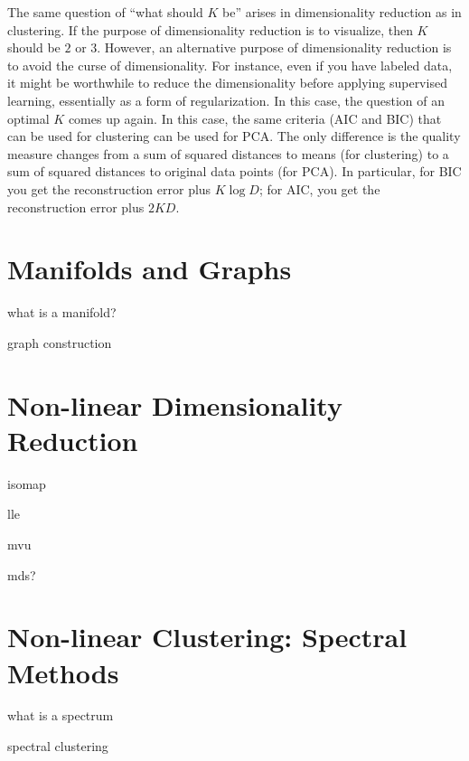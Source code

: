 The same question of ``what should $K$ be'' arises in dimensionality
reduction as in clustering.  If the purpose of dimensionality
reduction is to visualize, then $K$ should be $2$ or $3$.  However, an
alternative purpose of dimensionality reduction is to avoid the curse
of dimensionality.  For instance, even if you have labeled data, it
might be worthwhile to reduce the dimensionality before applying
supervised learning, essentially as a form of regularization.  In this
case, the question of an optimal $K$ comes up again.  In this case,
the same criteria (AIC and BIC) that can be used for clustering can be
used for PCA.  The only difference is the quality measure changes from
a sum of squared distances to means (for clustering) to a sum of
squared distances to original data points (for PCA).  In particular,
for BIC you get the reconstruction error plus $K \log D$; for AIC, you
get the reconstruction error plus $2 K D$.




\section{Manifolds and Graphs}

what is a manifold?

graph construction

\section{Non-linear Dimensionality Reduction}

isomap

lle

mvu

mds?

\section{Non-linear Clustering: Spectral Methods}

what is a spectrum

spectral clustering

\begin{comment}
- pca
- lsa/svd
- mds
- manifold
- JL
- kmeans++
- hierarchical clustering
- spectral clustering
\end{comment}



